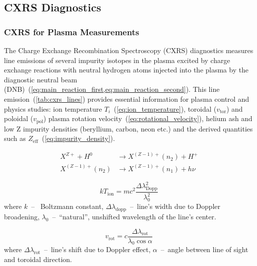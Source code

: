 \documentclass[../main.tex]{subfiles}
\begin{document}
\subsection{CXRS Diagnostics}
\subsubsection{CXRS for Plasma Measurements}

The Charge Exchange Recombination Spectroscopy (CXRS) diagnostics measures line emissions of several impurity isotopes in the plasma excited by charge exchange reactions with neutral hydrogen atoms injected into the plasma by the diagnostic neutral beam (DNB)~(\cref{eq:main_reaction_first,eq:main_reaction_second}). This line emission~(\cref{tab:cxrs_lines}) provides essential information for plasma control and physics studies: ion temperature $T_i$~(\cref{eq:ion_temperature}), toroidal ($v_\text{tor}$) and poloidal ($v_\text{pol}$) plasma rotation velocity~(\cref{eq:rotational_velocity}), helium ash and low Z impurity densities (beryllium, carbon, neon etc.) and the derived quantities such as $Z_\text{eff}$~(\cref{eq:impurity_density}).

\begin{align}
    X^{Z+} + H^0    & \to X^{(Z-1)+}(n_2) + H^+ \label{eq:main_reaction_first}   \\
    X^{(Z-1)+}(n_2) & \to X^{(Z-1)+}(n_1) + h\nu \label{eq:main_reaction_second}
\end{align}

\begin{equation}
    \label{eq:ion_temperature}
    kT_\text{ion} = mc^2 \dfrac{{\Delta\lambda}_\text{Dopp}^2}{\lambda_{0}^{2}}
\end{equation}
where $k$~--~ Boltzmann constant, ${\Delta\lambda}_\text{dopp}$~--~line's width due to Doppler broadening, $\lambda_0$~--~\enquote{natural}, unshifted wavelength of the line's center.

\begin{equation}
    \label{eq:rotational_velocity}
    v_\text{rot} = c \dfrac{\Delta\lambda_\text{rot}}{\lambda_{0} \cos \alpha}
\end{equation}
where ${\Delta\lambda}_\text{rot}$~--~line's shift due to Doppler effect, $\alpha$~--~angle between line of sight and toroidal direction.
\end{document}

